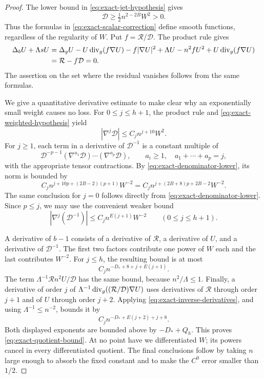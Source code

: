 \begin{proof}
The lower bound in \eqref{eq:exact-jet-hypothesis} gives
\begin{equation}
 \mathcal D\ge \tfrac12 n^{2-2B}W^2>0.
 \label{eq:exact-denominator-lower}
\end{equation}
Thus the formulas in \eqref{eq:exact-scalar-correction} define smooth
functions, regardless of the regularity of \(W\).  Put
\(f=\mathcal R/\mathcal D\).  The product rule gives
\begin{align*}
 \Delta_bU+\Lambda sU
 &=\Delta_gU-U\operatorname{div}_g(f\nabla U)-f|\nabla U|^2
   +\Lambda U-n^2fU^2+U\operatorname{div}_g(f\nabla U)\\
 &=\mathcal R-f\mathcal D=0.
\end{align*}
The assertion on the set where the residual vanishes follows from the
same formulas.

We give a quantitative derivative estimate to make clear why an
exponentially small weight causes no loss.  For \(0\le j\le h+1\),
the product rule and \eqref{eq:exact-weighted-hypothesis} yield
\[
 |\nabla^j\mathcal D|\le C_j n^{j+10}W^2.
\]
For \(j\ge1\), each term in a derivative of
\(\mathcal D^{-1}\) is a constant multiple of
\[
 \mathcal D^{-p-1}
 (\nabla^{a_1}\mathcal D)\cdots
 (\nabla^{a_p}\mathcal D),
 \qquad a_i\ge1,\quad a_1+\cdots+a_p=j,
\]
with the appropriate tensor contractions.  By
\eqref{eq:exact-denominator-lower}, its norm is bounded by
\[
 C_jn^{j+10p+(2B-2)(p+1)}W^{-2}
 =C_jn^{j+(2B+8)p+2B-2}W^{-2}.
\]
The same conclusion for \(j=0\) follows directly from
\eqref{eq:exact-denominator-lower}.  Since \(p\le j\), we may use the
convenient weaker bound
\begin{equation}
 |\nabla^j(\mathcal D^{-1})|
 \le C_jn^{E(j+1)}W^{-2}
 \qquad (0\le j\le h+1).
 \label{eq:exact-inverse-derivatives}
\end{equation}

A derivative of \(b-1\) consists of a derivative of \(\mathcal R\),
a derivative of \(U\), and a derivative of \(\mathcal D^{-1}\).
The first two factors contribute one power of \(W\) each and the last
contributes \(W^{-2}\).  For \(j\le h\), the resulting bound is at most
\[
 C_jn^{-D_*+8+j+E(j+1)}.
\]
The term \(\Lambda^{-1}\mathcal Rn^2U/\mathcal D\) has the same
bound, because \(n^2/\Lambda\le1\).  Finally, a derivative of order
\(j\) of
\(\Lambda^{-1}\operatorname{div}_g((\mathcal R/\mathcal D)\nabla U)\)
uses derivatives of \(\mathcal R\) through order \(j+1\) and of
\(U\) through order \(j+2\).  Applying
\eqref{eq:exact-inverse-derivatives}, and using
\(\Lambda^{-1}\le n^{-2}\), bounds it by
\[
 C_jn^{-D_*+E(j+2)+j+8}.
\]
Both displayed exponents are bounded above by \(-D_*+Q_h\).
This proves \eqref{eq:exact-quotient-bound}.  At no point have we
differentiated \(W\); its powers cancel in every differentiated
quotient.  The final conclusions follow by taking \(n\) large enough
to absorb the fixed constant and to make the \(C^0\) error smaller
than \(1/2\).
\end{proof}

